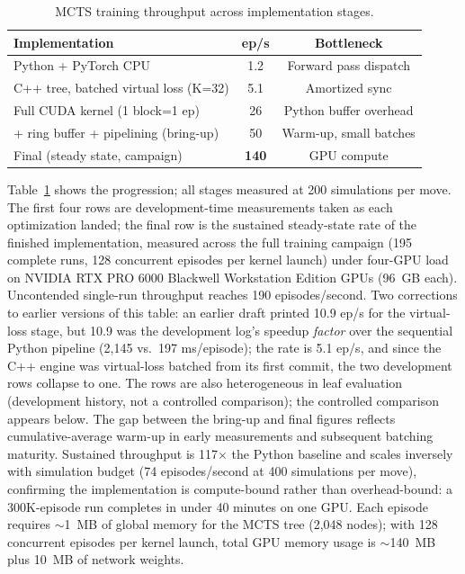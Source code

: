 \documentclass[journal]{IEEEtran}
\begin{document}
\begin{table}[t]
\centering
\caption{MCTS training throughput across implementation stages.}
\label{tab:throughput}
\begin{tabular}{lcc}
\toprule
Implementation & ep/s & Bottleneck \\
\midrule
Python + PyTorch CPU & 1.2 & Forward pass dispatch \\
C++ tree, batched virtual loss (K=32) & 5.1 & Amortized sync \\
Full CUDA kernel (1 block=1 ep) & 26 & Python buffer overhead \\
+ ring buffer + pipelining (bring-up) & 50 & Warm-up, small batches \\
Final (steady state, campaign) & \textbf{140} & GPU compute \\
\bottomrule
\end{tabular}
\end{table}

Table~\ref{tab:throughput} shows the progression; all stages measured at 200 simulations per move. The first four rows are development-time measurements taken as each optimization landed; the final row is the sustained steady-state rate of the finished implementation, measured across the full training campaign (195 complete runs, 128 concurrent episodes per kernel launch) under four-GPU load on NVIDIA RTX PRO 6000 Blackwell Workstation Edition GPUs (96~GB each). Uncontended single-run throughput reaches 190 episodes/second. Two corrections to earlier versions of this table: an earlier draft printed 10.9 ep/s for the virtual-loss stage, but 10.9 was the development log's speedup \textit{factor} over the sequential Python pipeline (2{,}145 vs.\ 197 ms/episode); the rate is 5.1 ep/s, and since the C++ engine was virtual-loss batched from its first commit, the two development rows collapse to one. The rows are also heterogeneous in leaf evaluation (development history, not a controlled comparison); the controlled comparison appears below. The gap between the bring-up and final figures reflects cumulative-average warm-up in early measurements and subsequent batching maturity. Sustained throughput is 117$\times$ the Python baseline and scales inversely with simulation budget (74 episodes/second at 400 simulations per move), confirming the implementation is compute-bound rather than overhead-bound: a 300K-episode run completes in under 40 minutes on one GPU. Each episode requires $\sim$1~MB of global memory for the MCTS tree (2,048 nodes); with 128 concurrent episodes per kernel launch, total GPU memory usage is $\sim$140~MB plus 10~MB of network weights.
\end{document}
